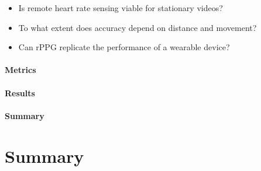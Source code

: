 \begin{itemize}
    \item Is remote heart rate sensing viable for stationary videos?
    \item To what extent does accuracy depend on distance and movement?
    \item Can rPPG replicate the performance of a wearable device?
\end{itemize}
\paragraph{Metrics}
\paragraph{Results}

\paragraph{Summary}


\section{Summary}